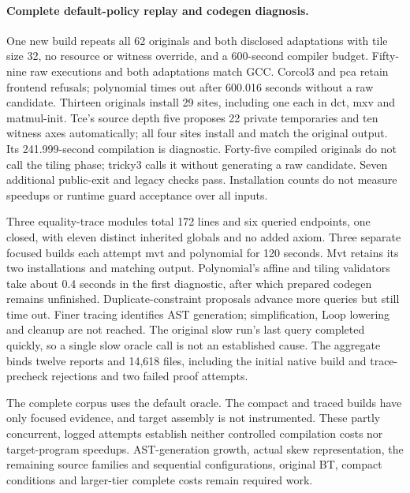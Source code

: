 \paragraph{Complete default-policy replay and codegen diagnosis.}
One new build repeats all 62 originals and both disclosed adaptations with tile
size 32, no resource or witness override, and a 600-second compiler budget.
Fifty-nine raw executions and both adaptations match GCC. Corcol3 and pca
retain frontend refusals; polynomial times out after 600.016 seconds without
a raw candidate. Thirteen originals install 29 sites, including one each in
dct, mxv and matmul-init. Tce's source depth five proposes 22 private temporaries
and ten witness axes automatically; all four sites install and match the
original output. Its 241.999-second compilation is diagnostic. Forty-five
compiled originals do not call the tiling phase; tricky3 calls it without
generating a raw candidate. Seven additional public-exit and legacy checks
pass. Installation counts do not measure speedups or runtime guard acceptance
over all inputs.

Three equality-trace modules total 172 lines and six queried endpoints, one
closed, with eleven distinct inherited globals and no added axiom. Three
separate focused builds each attempt mvt and polynomial for 120 seconds.
Mvt retains its two installations and matching output. Polynomial's affine
and tiling validators take about 0.4 seconds in the first diagnostic, after
which prepared codegen remains unfinished. Duplicate-constraint proposals
advance more queries but still time out. Finer tracing identifies AST generation;
simplification, Loop lowering and cleanup are not reached. The original slow
run's last query completed quickly, so a single slow oracle call is not an
established cause. The aggregate binds twelve reports and 14,618 files,
including the initial native build and trace-precheck rejections and two failed
proof attempts.

The complete corpus uses the default oracle. The compact and traced builds have
only focused evidence, and target assembly is not instrumented. These partly
concurrent, logged attempts establish neither controlled compilation costs nor
target-program speedups. AST-generation growth, actual skew representation,
the remaining source families and sequential configurations, original BT,
compact conditions and larger-tier complete costs remain required work.

